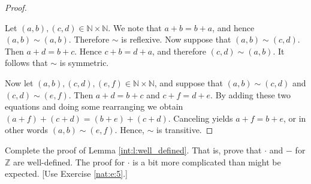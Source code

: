 \begin{proof}
	\begin{notmine}
		Let $(a, b),(c, d) \in \mathbb{N} \times \mathbb{N}$. We note that $a+b=b+a$, and hence $(a, b) \sim(a, b)$. Therefore $\sim$ is reflexive. Now suppose that $(a, b) \sim(c, d)$. Then $a+d=b+c$. Hence $c+b=d+a$, and therefore $(c, d) \sim(a, b) .$ It follows that $\sim$ is symmetric.
	\end{notmine}

	Now let $(a, b), (c, d), (e, f) \in \mathbb{N} \times \mathbb{N}$, and suppose that $(a, b) \sim (c, d)$ and $(c, d) \sim (e, f)$. Then $a + d = b + c$ and $c + f = d + e$. By adding these two equations and doing some rearranging we obtain $(a + f) + (c + d) = (b + e) + (c + d)$. Canceling yields $a + f = b + e$, or in other words $(a, b) \sim (e, f)$. Hence, $\sim$ is transitive.
\end{proof}


\Newpage
\begin{exercise} %
	\label{int:e:3}
	Complete the proof of Lemma \ref{int:l:well_defined}. That is, prove that $\cdot$ and $-$ for $\mathbb{Z}$ are well-defined. The proof for $\cdot$ is a bit more complicated than might be expected. \hfill [Use Exercise \ref{nat:e:5}.]
\end{exercise}

